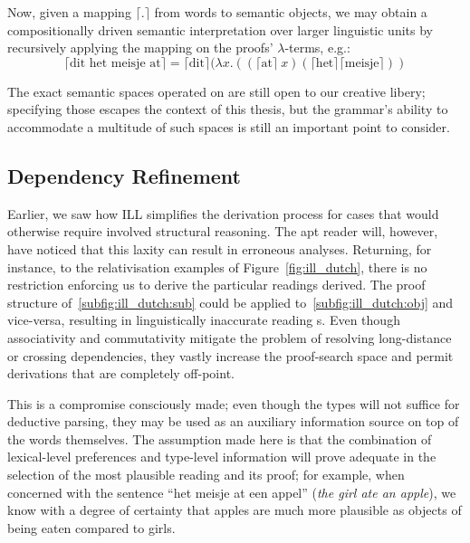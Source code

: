 Now, given a mapping $\lceil .\rceil$ from words to semantic objects, we may obtain a compositionally driven semantic interpretation over larger linguistic units by recursively applying the mapping on the proofs' $\lambda$-terms, e.g.:
\[
\lceil \text{dit het meisje at} \rceil = \lceil \text{dit} \rceil (\lambda x. ((\lceil \text{at} \rceil \ x)(\lceil \text{het} \rceil \lceil \text{meisje} \rceil))
\]

The exact semantic spaces operated on are still open to our creative libery; specifying those escapes the context of this thesis, but the grammar's ability to accommodate a multitude of such spaces is still an important point to consider.

\subsection{Dependency Refinement}
Earlier, we saw how ILL simplifies the derivation process for cases that would otherwise require involved structural reasoning.
The apt reader will, however, have noticed that this laxity can result in erroneous analyses.
Returning, for instance, to the relativisation examples of Figure~\ref{fig:ill_dutch}, there is no restriction enforcing us to derive the particular readings derived.
The proof structure of~\ref{subfig:ill_dutch:sub} could be applied to~\ref{subfig:ill_dutch:obj} and vice-versa, resulting in linguistically inaccurate reading	s.
Even though associativity and commutativity mitigate the problem of resolving long-distance or crossing dependencies, they vastly increase the proof-search space and permit derivations that are completely off-point.

This is a compromise consciously made; even though the types will not suffice for deductive parsing, they may be used as an auxiliary information source on top of the words themselves.
The assumption made here is that the combination of lexical-level preferences and type-level information will prove adequate in the selection of the most plausible reading and its proof; for example, when concerned with the sentence ``het meisje at een appel'' (\textit{the girl ate an apple}), we know with a degree of certainty that apples are much more plausible as objects of being eaten compared to girls.

\begin{figure}
\centering

\end{figure}


